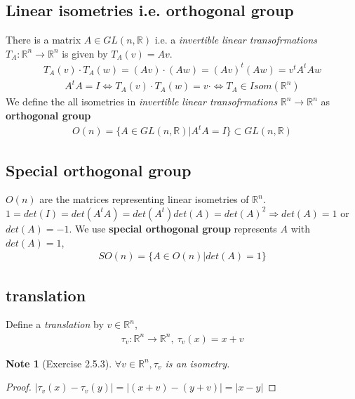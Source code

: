 \documentclass[11pt,a4paper]{article}
\newtheorem{note}{Note}
\begin{document}
\subsection{ Linear isometries i.e. orthogonal group}
There is a matrix $A\in GL(n,\mathbb{R})$ i.e. a \textit{invertible linear transofrmations} $T_A: \mathbb{R}^n \rightarrow \mathbb{R}^n$ is given by $T_A(v)=Av$.
\begin{equation}
    \begin{aligned}
        T_A(v)\cdot T_A(w)=(Av)\cdot(Aw)=(Av)^t(Aw)=v^tA^tAw
    \end{aligned}
    \nonumber
\end{equation}
\begin{equation}
    \begin{aligned}
        A^tA=I\Leftrightarrow T_A(v)\cdot T_A(w)=v\cdot \Leftrightarrow T_A\in Isom(\mathbb{R}^n)
    \end{aligned}
    \nonumber
\end{equation}
We define the all isometries in \textit{invertible linear transofrmations} $\mathbb{R}^n \rightarrow \mathbb{R}^n$ as \textbf{orthogonal group}
\begin{equation}
    \begin{aligned}
        O(n)=\{A\in GL(n,\mathbb{R})|A^tA=I \}\subset GL(n,\mathbb{R})
    \end{aligned}
    \nonumber
\end{equation}

\subsection{Special orthogonal group}
$O(n)$ are the matrices representing linear isometries of $\mathbb{R}^n$.
$1=det(I)=det(A^tA)=det(A^t)det(A)=det(A)^2 \Rightarrow	det(A)=1$ or $det(A)=-1$. We use \textbf{special orthogonal group} represents $A$ with $det(A)=1$,
\begin{equation}
    \begin{aligned}
        SO(n)=\{A\in O(n) | det(A)=1\}
    \end{aligned}
    \nonumber
\end{equation}

\subsection{translation}
Define a \textit{translation} by $v\in \mathbb{R}^n$,
\begin{equation}
    \begin{aligned}
        \tau_v:\mathbb{R}^n \rightarrow \mathbb{R}^n,\ \tau_v(x)=x+v
    \end{aligned}
    \nonumber
\end{equation}
\begin{note}[Exercise 2.5.3]
$\forall v\in \mathbb{R}^n, \tau_v$ is an isometry.
\end{note}
\begin{proof}
$|\tau_v(x)-\tau_v(y)|=|(x+v)-(y+v)|=|x-y|$
\end{proof}
\end{document}
